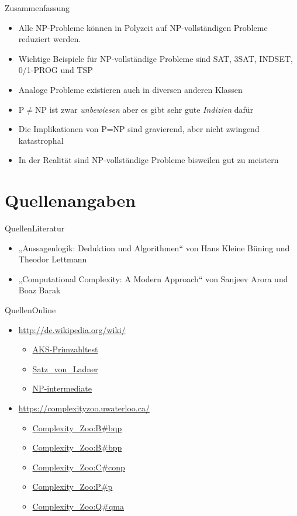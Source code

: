 \documentclass[ignorenonframetext,]{beamer}
\begin{document}
\begin{frame}{Zusammenfassung}

\begin{itemize}
\itemsep1pt\parskip0pt
\item
  Alle NP-Probleme können in Polyzeit auf NP-vollständigen Probleme
  reduziert werden.
\item
  Wichtige Beispiele für NP-vollständige Probleme sind SAT, 3SAT,
  INDSET, 0/1-PROG und TSP
\item
  Analoge Probleme existieren auch in diversen anderen Klassen
\item
  P$\neq$NP ist zwar \emph{unbewiesen} aber es gibt sehr gute
  \emph{Indizien} dafür
\item
  Die Implikationen von P=NP sind gravierend, aber nicht zwingend
  katastrophal
\item
  In der Realität sind NP-vollständige Probleme bisweilen gut zu
  meistern
\end{itemize}

\end{frame}

\section{Quellenangaben}\label{quellenangaben}

\begin{frame}{Quellen}{Literatur}
\begin{itemize}
	\item „Aussagenlogik: Deduktion und Algorithmen“ von Hans Kleine Büning und Theodor Lettmann
	\item „Computational Complexity: A Modern Approach“ von Sanjeev Arora und Boaz Barak
\end{itemize}
\end{frame}

\begin{frame}{Quellen}{Online}

\begin{itemize}
	\item \url{http://de.wikipedia.org/wiki/}
		\begin{itemize}
			\item \url{AKS-Primzahltest}
			\item \url{Satz\_von\_Ladner}
			\item \url{NP-intermediate}
		\end{itemize}
	\item \url{https://complexityzoo.uwaterloo.ca/}
		\begin{itemize}
			\item \url{Complexity\_Zoo:B\#bqp}
			\item \url{Complexity\_Zoo:B\#bpp}
			\item \url{Complexity\_Zoo:C\#conp}
			\item \url{Complexity\_Zoo:P\#p}
			\item \url{Complexity\_Zoo:Q\#qma}
		\end{itemize}
\end{itemize}
\end{frame}
\end{document}
